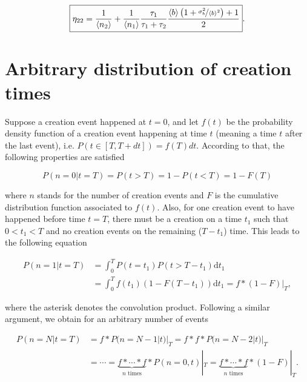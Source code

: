 \begin{equation}
  \boxed{\eta_{22}=\frac{1}{\langle n_2\rangle} + \frac{1}{\langle n_1\rangle} \frac{\tau_1}{\tau_1 + \tau_2} \frac{\langle b\rangle\left(1+\nicefrac{\sigma_b^2}{\langle b\rangle^2}\right)+1}{2}}.
\end{equation}


\section{Arbitrary distribution of creation times}

Suppose a creation event happened at $t=0$, and let $f(t)$ be the probability density function of a creation event happening at time $t$ (meaning a time $t$ after the last event), i.e. $P(t\in[T,T+dt])=f(T)dt$. According to that, the following properties are satisfied

\begin{equation*}
P(n=0|t=T) = P(t>T) = 1 - P(t<T) = 1 - F(T)
\end{equation*}

where $n$ stands for the number of creation events and $F$ is the cumulative distribution function associated to $f(t)$. Also, for one creation event to have happened before time $t=T$, there must be a creation on a time $t_1$ such that $0<t_1<T$ and no creation events on the remaining ($T-t_1$) time. This leads to the following equation

\begin{equation*}
  \begin{split}
    P(n=1|t=T) &= \int_0^TP(t=t_1)P(t>T-t_1)\mathrm{d}t_1 \\
    &= \int_0^Tf(t_1)(1-F(T-t_1))\mathrm{d}t_1=f\ast (1-F)|_T,
  \end{split}
\end{equation*}

where the asterisk denotes the convolution product. Following a similar argument, we obtain for an arbitrary number of events

\begin{equation}
  \label{eq:nconvs}
  \begin{split}
    P(n=N|t=T) &= f\ast P(n=N-1|t)|_T = f\ast f\ast P(n=N-2|t)|_T \\
    &= \cdots = \underbrace{f\ast\cdots\ast f}_{n \text{ times}}\ast P(n=0,t)|_T = \underbrace{f\ast\cdots\ast f}_{n \text{ times}}\ast (1-F)|_T.
  \end{split}
\end{equation}


